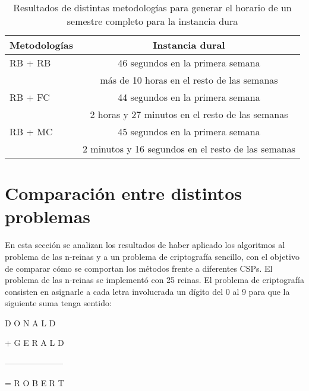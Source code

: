 \begin{table}[h]
	\caption{Resultados de distintas metodolog\'ias para generar el horario de un semestre completo para la instancia dura}
	\begin{center}
		\label{2semestre}
		\begin{tabular}{|l|c||}
			\hline \hline
			Metodolog\'ias & Instancia dural \\ \hline
			RB + RB & 46 segundos en la primera semana \\
			 &  m\'as de 10 horas en el resto de las semanas \\ \hline
			RB + FC & 44 segundos en la primera semana \\
			 & 2 horas y 27 minutos en el resto de las semanas \\ \hline
			RB + MC & 45 segundos en la primera semana \\
			 & 2 minutos y 16 segundos en el resto de las semanas \\ \hline
		\end{tabular}
	\end{center}
\end{table}

\section{Comparaci\'on entre distintos problemas}

En esta secci\'on se analizan los resultados de haber aplicado los algoritmos al problema de las n-reinas y a un problema de criptograf\'ia sencillo, con el objetivo de comparar c\'omo se comportan los m\'etodos frente a diferentes CSPs. El problema de las n-reinas se implement\'o con 25 reinas. El problema de criptograf\'ia consisten en asignarle a cada letra involucrada un d\'igito del 0 al 9 para que la siguiente suma tenga sentido:

\begin{center}
\quad D O N A L D
	
+ G E R A L D

---------------------

= R O B E R T
\end{center}

